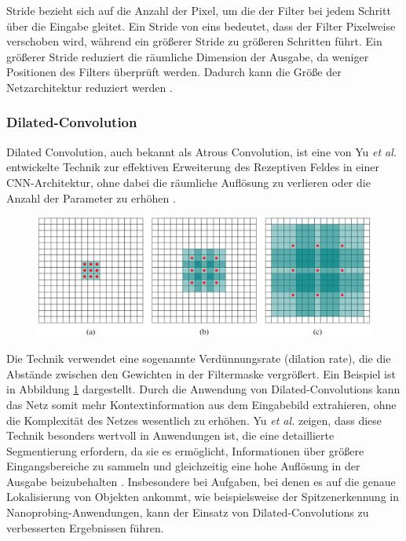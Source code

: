 Stride bezieht sich auf die Anzahl der Pixel, um die der Filter bei jedem Schritt über die Eingabe gleitet. Ein Stride von eins bedeutet, dass der Filter Pixelweise verschoben wird, während ein größerer Stride zu größeren Schritten führt. Ein größerer Stride reduziert die räumliche Dimension der Ausgabe, da weniger Positionen des Filters überprüft werden. Dadurch kann die Größe der Netzarchitektur reduziert werden \cite{convolution}.

\subsubsection{Dilated-Convolution}
\label{sec:dilconv}
Dilated Convolution, auch bekannt als Atrous Convolution, ist eine von Yu \textit{et al.} entwickelte Technik zur effektiven Erweiterung des Rezeptiven Feldes in einer CNN-Architektur, ohne dabei die räumliche Auflösung zu verlieren oder die Anzahl der Parameter zu erhöhen \cite{yu2015multi}.
\begin{figure}[htbp]
    \centering
    \includegraphics[width=.7\linewidth]{img/dilconv.png}
    \label{fig:dilconv}
\end{figure}
Die Technik verwendet eine sogenannte Verdünnungsrate (dilation rate), die die Abstände zwischen den Gewichten in der Filtermaske vergrößert. Ein Beispiel ist in Abbildung \ref{fig:dilconv} dargestellt. Durch die Anwendung von Dilated-Convolutions kann das Netz somit mehr Kontextinformation aus dem Eingabebild extrahieren, ohne die Komplexität des Netzes wesentlich zu erhöhen. Yu \textit{et al.} zeigen, dass diese Technik besonders wertvoll in Anwendungen ist, die eine detaillierte Segmentierung erfordern, da sie es ermöglicht, Informationen über größere Eingangsbereiche zu sammeln und gleichzeitig eine hohe Auflösung in der Ausgabe beizubehalten \cite{Yu_2017_CVPR}. Insbesondere bei Aufgaben, bei denen es auf die genaue Lokalisierung von Objekten ankommt, wie beispielsweise der Spitzenerkennung in Nanoprobing-Anwendungen, kann der Einsatz von Dilated-Convolutions zu verbesserten Ergebnissen führen.

